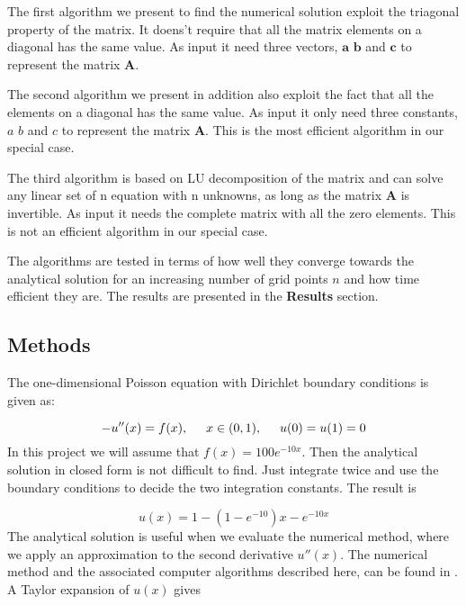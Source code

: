 \documentclass[11pt]{article}
\begin{document}
\vspace{4mm}
\noindent
The first algorithm we present to find the numerical solution exploit the triagonal property 
of the matrix. It doens't require that all the matrix elements on a diagonal has the same
value. As input it need three vectors, $\mathbf a$ $\mathbf b$ and $\mathbf c$ to represent
the matrix $\mathbf A$.

\vspace{4mm}
\noindent
The second algorithm we present in addition also exploit the fact that all the elements on a diagonal
has the same value. As input it only need three constants, $a$ $b$ and $ c$ to represent
the matrix $\mathbf A$. This is the most efficient algorithm in our special case.

\vspace{4mm}
\noindent
The third algorithm is based on LU decomposition of the matrix and can solve any linear set of
n equation with n unknowns, as long as the matrix $\mathbf A$ is invertible. As input it
needs the complete matrix with all the zero elements. This is not an efficient algorithm in
our special case.

\vspace{4mm}
\noindent
The algorithms are tested in terms of how well they converge towards the analytical solution
for an increasing number of grid points $n$ and how time efficient they are. The results
are presented in the \textbf{Results} section. 


\subsection*{Methods}
The one-dimensional Poisson equation with Dirichlet boundary conditions is given as:

\begin{equation}
-u''(x) = f(x), \hspace{0.5cm} x\in(0,1), \hspace{0.5cm} u(0) = u(1) = 0
\label{lig1}
\end{equation}
In this project we will assume that $f(x) = 100e^{-10x}$. Then the analytical solution in 
closed form is not difficult to find. Just integrate twice and use the boundary conditions 
to decide the two integration constants. The result is

\begin{equation*}
u(x) = 1-(1-e^{-10})x-e^{-10x}
\label{lig2}
\end{equation*}
The analytical solution is useful when we evaluate the numerical method, where we apply
an approximation to the second derivative $u''(x)$. The numerical method and the
associated computer algorithms described here, can be found in \cite{mhh}. 
A Taylor expansion of $u(x)$  gives
\end{document}
